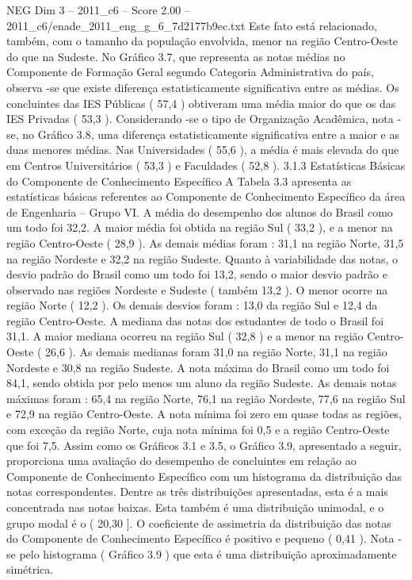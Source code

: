 \begin{textsample}{NEG Dim 3 – 2011\_c6 – Score 2.00 – 2011\_c6/enade\_2011\_eng\_g\_6\_7d2177b9ec.txt}
Este fato está relacionado, também, com o tamanho da população envolvida, menor na região Centro-Oeste do que na Sudeste.
No Gráfico 3.7, que representa as notas médias no Componente de Formação Geral segundo Categoria Administrativa do país, observa -se que existe diferença estatisticamente significativa entre as médias.
Os concluintes das IES Públicas ( 57,4 ) obtiveram uma média maior do que os das IES Privadas ( 53,3 ).
Considerando -se o tipo de Organização Acadêmica, nota -se, no Gráfico 3.8, uma diferença estatisticamente significativa entre a maior e as duas menores médias.
Nas Universidades ( 55,6 ), a média é mais elevada do que em Centros Universitários ( 53,3 ) e Faculdades ( 52,8 ). 3.1.3 Estatísticas Básicas do Componente de Conhecimento Específico A Tabela 3.3 apresenta as estatísticas básicas referentes ao Componente de Conhecimento Específico da área de Engenharia – Grupo VI.
A média do desempenho dos alunos do Brasil como um todo foi 32,2.
A maior média foi obtida na região Sul ( 33,2 ), e a menor na região Centro-Oeste ( 28,9 ).
As demais médias foram : 31,1 na região Norte, 31,5 na região Nordeste e 32,2 na região Sudeste.
Quanto à variabilidade das notas, o desvio padrão do Brasil como um todo foi 13,2, sendo o maior desvio padrão e observado nas regiões Nordeste e Sudeste ( também 13,2 ).
O menor ocorre na região Norte ( 12,2 ).
Os demais desvios foram : 13,0 da região Sul e 12,4 da região Centro-Oeste.
A mediana das notas dos estudantes de todo o Brasil foi 31,1.
A maior mediana ocorreu na região Sul ( 32,8 ) e a menor na região Centro-Oeste ( 26,6 ).
As demais medianas foram 31,0 na região Norte, 31,1 na região Nordeste e 30,8 na região Sudeste.
A nota máxima do Brasil como um todo foi 84,1, sendo obtida por pelo menos um aluno da região Sudeste.
As demais notas máximas foram : 65,4 na região Norte, 76,1 na região Nordeste, 77,6 na região Sul e 72,9 na região Centro-Oeste.
A nota mínima foi zero em quase todas as regiões, com exceção da região Norte, cuja nota mínima foi 0,5 e a região Centro-Oeste que foi 7,5.
Assim como os Gráficos 3.1 e 3.5, o Gráfico 3.9, apresentado a seguir, proporciona uma avaliação do desempenho de concluintes em relação ao Componente de Conhecimento Específico com um histograma da distribuição das notas correspondentes.
Dentre as três distribuições apresentadas, esta é a mais concentrada nas notas baixas.
Esta também é uma distribuição unimodal, e o grupo modal é o ( 20,30 ].
O coeficiente de assimetria da distribuição das notas do Componente de Conhecimento Específico é positivo e pequeno ( 0,41 ).
Nota -se pelo histograma ( Gráfico 3.9 ) que esta é uma distribuição aproximadamente simétrica.

\end{textsample}
